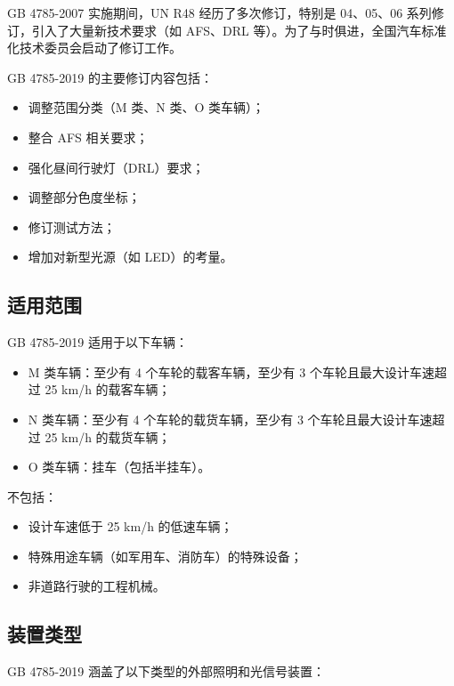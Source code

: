 GB 4785-2007 实施期间，UN R48 经历了多次修订，特别是 04、05、06 系列修订，引入了大量新技术要求（如 AFS、DRL 等）。为了与时俱进，全国汽车标准化技术委员会启动了修订工作。

GB 4785-2019 的主要修订内容包括：

\begin{itemize}[leftmargin=2em]
    \item 调整范围分类（M 类、N 类、O 类车辆）；
    \item 整合 AFS 相关要求；
    \item 强化昼间行驶灯（DRL）要求；
    \item 调整部分色度坐标；
    \item 修订测试方法；
    \item 增加对新型光源（如 LED）的考量。
\end{itemize}

\subsection{适用范围}

GB 4785-2019 适用于以下车辆：

\begin{itemize}[itemsep=0.2em]
    \item M 类车辆：至少有 4 个车轮的载客车辆，至少有 3 个车轮且最大设计车速超过 25 km/h 的载客车辆；
    \item N 类车辆：至少有 4 个车轮的载货车辆，至少有 3 个车轮且最大设计车速超过 25 km/h 的载货车辆；
    \item O 类车辆：挂车（包括半挂车）。
\end{itemize}

不包括：

\begin{itemize}[itemsep=0.2em]
    \item 设计车速低于 25 km/h 的低速车辆；
    \item 特殊用途车辆（如军用车、消防车）的特殊设备；
    \item 非道路行驶的工程机械。
\end{itemize}

\subsection{装置类型}

GB 4785-2019 涵盖了以下类型的外部照明和光信号装置：

